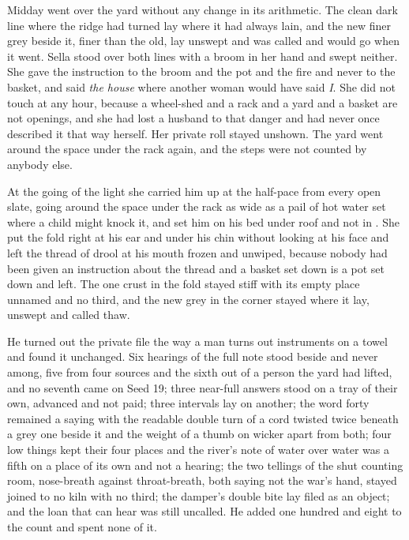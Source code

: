 \scenebreak

Midday went over the yard without any change in its arithmetic. The clean dark line where the  ridge had turned lay where it had always lain, and the new finer grey beside it, finer than the old, lay unswept and was called  and would go when it went. Sella stood over both lines with a broom in her hand and swept neither. She gave the instruction to the broom and the pot and the fire and never to the basket, and said \emph{the house} where another woman would have said \emph{I}. She did not touch  at any hour, because a wheel-shed and a rack and a yard and a basket are not openings, and she had lost a husband to that danger and had never once described it that way herself. Her private roll stayed unshown. The yard went around the space under the rack again, and the steps were not counted by anybody else.

At the going of the light she carried him up at the half-pace from every open slate, going around the space under the rack as wide as a pail of hot water set where a child might knock it, and set him on his bed under  roof and not in . She put the fold right at his ear and under his chin without looking at his face and left the thread of drool at his mouth frozen and unwiped, because nobody had been given an instruction about the thread and a basket set down is a pot set down and left. The one crust in the fold stayed stiff with its empty place unnamed and no third, and the new grey in the corner stayed where it lay, unswept and called thaw.

He turned out the private file the way a man turns out instruments on a towel and found it unchanged. Six hearings of the full note stood beside and never among, five from four sources and the sixth out of a person the yard had lifted, and no seventh came on Seed 19; three near-full answers stood on a tray of their own, advanced and not paid; three intervals lay on another; the word forty remained a saying with the readable double turn of a cord twisted twice beneath a grey one beside it and the weight of a thumb on wicker apart from both; four low things kept their four places and the river's note of water over water was a fifth on a place of its own and not a hearing; the two tellings of the shut counting room, nose-breath against throat-breath, both saying not the war's hand, stayed joined to no kiln with no third; the damper's double bite lay filed as an object; and the loan that can hear was still uncalled. He added one hundred and eight to the count and spent none of it.

